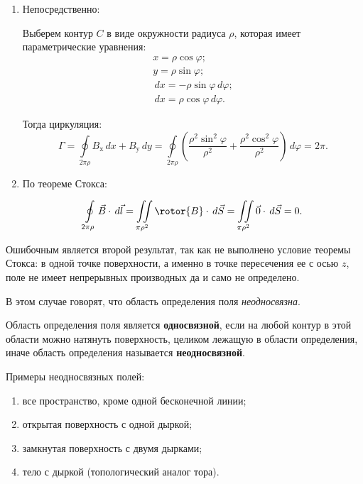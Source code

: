 	\begin{solution}
	
	\begin{enumerate}
	\item Непосредственно:
	
	Выберем контур \( C \) в виде окружности радиуса \( \rho \), которая имеет параметрические уравнения:
	\[ \begin{array}{l}
		x = \rho\cos\varphi; \\
		y = \rho\sin\varphi; \\
		\,d x = -\rho\sin\varphi\,d\varphi; \\
		\,d x = \rho\cos\varphi\,d\varphi.
	\end{array} \]
	
	Тогда циркуляция:
	\[ \Gamma = \oint\limits_{2\pi\rho} B_\mathrm{x}\,d x + B_\mathrm{y}\,d y = \oint\limits_{2\pi\rho} \left(\frac{\rho^2\sin^2\varphi}{\rho^2} + \frac{\rho^2\cos^2\varphi}{\rho^2}\right)\,d\varphi = 2\pi.  \]
	
	\item По теореме Стокса:
	
	\[ \oint\limits_{2\pi\rho} \vec{B}\cdot\,d\vec{l} = \iint\limits_{\pi\rho^2}\rotor{B}\cdot\,d\vec{S} = \iint\limits_{\pi\rho^2}\vec{0}\cdot\,d\vec{S} = 0. \]
	\end{enumerate}
	\end{solution}
	 
	Ошибочным является второй результат, так как не выполнено условие теоремы Стокса: в одной точке поверхности, а именно в точке пересечения ее с осью \( z \), поле не имеет непрерывных производных да и само не определено.
	
	В этом случае говорят, что область определения поля \textit{неодносвязна}.
	
	\begin{definition}
	Область определения поля является \textbf{односвязной}, если на любой контур в этой области можно натянуть поверхность, целиком лежащую в области определения, иначе область определения называется \textbf{неодносвязной}.
	\end{definition}
	
	Примеры неодносвязных полей:
	\begin{enumerate}
	\item все пространство, кроме одной бесконечной линии;
	\item открытая поверхность с одной дыркой;
	\item замкнутая поверхность с двумя дырками;
	\item тело с дыркой  (топологический аналог тора).
	\end{enumerate}
